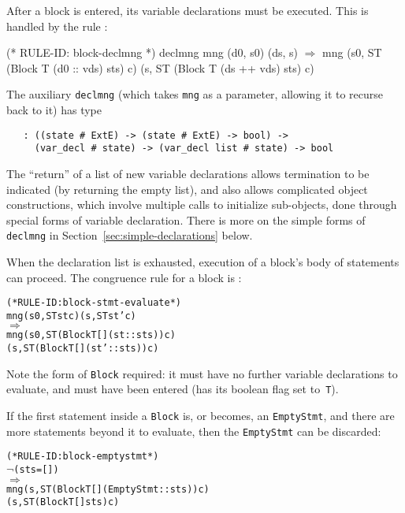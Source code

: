 \documentclass[11pt]{article}
\begin{document}
After a block is entered, its variable declarations must be executed.
This is handled by the rule :
\begin{stdrule}
(* RULE-ID: block-declmng *)
     declmng mng (d0, s0) (ds, s)
   \(\Rightarrow\)
     mng (s0, ST (Block T (d0 :: vds) sts) c)
         (s, ST (Block T (ds ++ vds) sts) c)
\end{stdrule}
%
The auxiliary \texttt{declmng} (which takes \texttt{mng} as a
parameter, allowing it to recurse back to it) has type
\begin{verbatim}
   : ((state # ExtE) -> (state # ExtE) -> bool) ->
     (var_decl # state) -> (var_decl list # state) -> bool
\end{verbatim}
The ``return'' of a list of new variable declarations allows
termination to be indicated (by returning the empty list), and also
allows complicated object constructions, which involve multiple calls
to initialize sub-objects, done through special forms of variable
declaration.  There is more on the simple forms of \texttt{declmng} in
Section~\ref{sec:simple-declarations} below.

When the declaration list is exhausted, execution of a block's body of
statements can proceed.  The congruence rule for a block is
:
\begin{center}
\begin{minipage}{\textwidth}
%
\begin{alltt}
(* RULE-ID: block-stmt-evaluate *)
     mng (s0, ST st c) (s, ST st' c)
   \(\Rightarrow\)
     mng (s0, ST (Block T [] (st :: sts)) c)
         (s, ST (Block T [] (st' :: sts)) c)
\end{alltt}
\end{minipage}
\end{center}
Note the form of \texttt{Block} required: it must have no further
variable declarations to evaluate, and must have been entered (has its
boolean flag set to~\texttt{T}).

If the first statement inside a \texttt{Block} is, or becomes, an
\texttt{EmptyStmt}, and there are more statements beyond it to
evaluate, then the \texttt{EmptyStmt} can be discarded:
\begin{center}
  \begin{minipage}{\textwidth}
\begin{alltt}
(* RULE-ID: block-emptystmt *)
     \(\neg\)(sts = [])
   \(\Rightarrow\)
     mng (s, ST (Block T [] (EmptyStmt::sts)) c)
         (s, ST (Block T [] sts) c)
\end{alltt}
\end{minipage}
\end{center}
\end{document}
